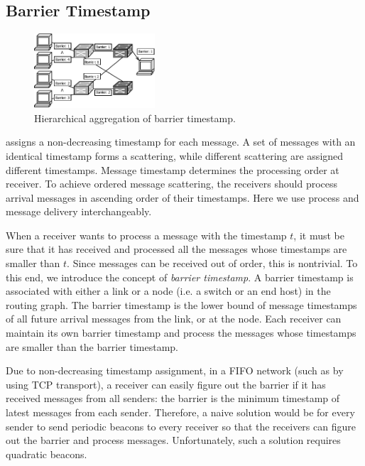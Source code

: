 \subsection{Barrier Timestamp}
\label{sec:ideal}

\begin{figure}[t]
\centering
\includegraphics[width=0.4\textwidth]{images/hierarchical_merge.pdf}
\caption{Hierarchical aggregation of barrier timestamp.} %
\label{fig:hierarchical_merge}
\vspace{-0.9em}
\end{figure}

\sys assigns a non-decreasing timestamp for each message. A set of messages with an identical timestamp forms a scattering, while different scattering are assigned different timestamps. %
Message timestamp determines the processing order at receiver. To achieve ordered message scattering, the receivers should process arrival messages in ascending order of their timestamps. Here we use process and message delivery interchangeably. 

 When a receiver wants to process a message with the timestamp $t$, it must be sure that it has received and processed all the messages whose timestamps are smaller than $t$. Since messages can be received out of order, this is nontrivial. To this end, we introduce the concept of \emph{barrier timestamp}. A barrier timestamp is associated with either a link or a node (i.e. a switch or an end host) in the routing graph. The barrier timestamp is the lower bound of message timestamps of all future arrival messages from the link, or at the node. Each receiver can maintain its own barrier timestamp and process the messages whose timestamps are smaller than the barrier timestamp.

Due to non-decreasing timestamp assignment, in a FIFO network (such as by using TCP transport), a receiver can easily figure out the barrier if it has received messages from all senders: the barrier is the minimum timestamp of latest messages from each sender. Therefore, a naive solution would be for every sender to send periodic beacons to every receiver so that the receivers can figure out the barrier and process messages. Unfortunately, such a solution requires quadratic beacons.

